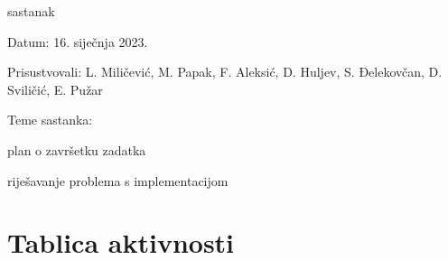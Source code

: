 \begin{packed_enum}
			\item  sastanak
			\item[] \begin{packed_item}
				\item Datum: 16. siječnja 2023.
				\item Prisustvovali: L. Miličević, M. Papak, F. Aleksić, D. Huljev, S. Đelekovčan, D. Sviličić, E. Pužar
				\item Teme sastanka:
				\begin{packed_item}
					\item plan o završetku zadatka
					\item riješavanje problema s implementacijom
				\end{packed_item}
			\end{packed_item}
			
			
		\end{packed_enum}
		
		\eject
		\section*{Tablica aktivnosti}
		
			

